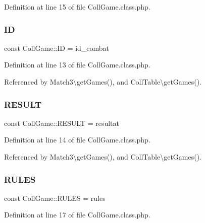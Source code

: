 Definition at line 15 of file Coll\+Game.\+class.\+php.

\mbox{\label{class_coll_game_a2a905bd73e9df3cdeae487ec4cfe6292}} 
\subsubsection{\texorpdfstring{ID}{ID}}
{\footnotesize\ttfamily const Coll\+Game\+::\+ID = \textquotesingle{}id\+\_\+combat\textquotesingle{}}



Definition at line 13 of file Coll\+Game.\+class.\+php.



Referenced by Match3\textbackslash{}get\+Games(), and Coll\+Table\textbackslash{}get\+Games().

\mbox{\label{class_coll_game_a1ebe4ea6067daab0bf58d8d8570f9754}} 
\subsubsection{\texorpdfstring{R\+E\+S\+U\+LT}{RESULT}}
{\footnotesize\ttfamily const Coll\+Game\+::\+R\+E\+S\+U\+LT = \textquotesingle{}resultat\textquotesingle{}}



Definition at line 14 of file Coll\+Game.\+class.\+php.



Referenced by Match3\textbackslash{}get\+Games(), and Coll\+Table\textbackslash{}get\+Games().

\mbox{\label{class_coll_game_a0c93bdda1203ad2341dea52bd404da0e}} 
\subsubsection{\texorpdfstring{R\+U\+L\+ES}{RULES}}
{\footnotesize\ttfamily const Coll\+Game\+::\+R\+U\+L\+ES = \textquotesingle{}rules\textquotesingle{}}



Definition at line 17 of file Coll\+Game.\+class.\+php.



